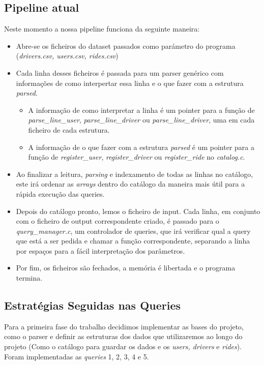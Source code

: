 \documentclass{article}
\begin{document}
        \subsection{Pipeline atual}
            Neste momento a nossa pipeline funciona da seguinte maneira: 
            \begin{itemize}
                \item Abre-se os ficheiros do dataset passados como parámetro do 
                programa (\emph{drivers.csv, users.csv, rides.csv})
                \item Cada linha desses ficheiros é passada para um parser genérico
                com informações de como interpertar essa linha e o que fazer com
                a estrutura \emph{parsed}.
                \begin{itemize}
                    \item A informação de como interpretar a linha é um pointer para
                    a função de \emph{parse\_line\_user}, \emph{parse\_line\_driver} ou \emph{parse\_line\_driver},
                    uma em cada ficheiro de cada estrutura.
                    \item A informação de o que fazer com a estrutura \emph{parsed} é um pointer para
                    a função de \emph{register\_user}, \emph{register\_driver} ou \emph{register\_ride}
                    no \emph{catalog.c}.
                \end{itemize}
                \item Ao finalizar a leitura, \emph{parsing} e indexamento de
                todas as linhas no catálogo, este irá ordenar as \emph{arrays} 
                dentro do catálogo da maneira mais útil para a rápida execução das 
                queries.
                \item Depois do catálogo pronto, lemos o ficheiro de input.
                Cada linha, em conjunto com o ficheiro de output correspondente criado,
                é passado para o \emph{query\_manager.c}, um controlador
                de queries, que irá verificar qual a query que está a ser pedida
                e chamar a função correspondente, separando a linha por espaços
                para a fácil interpretação dos parâmetros.
                \item Por fim, os ficheiros são fechados, a memória é libertada 
                e o programa termina.
            \end{itemize}
        \subsection{Estratégias Seguidas nas Queries}
            Para a primeira fase do trabalho decidimos implementar as bases do 
            projeto, como o parser e definir as estruturas dos dados que 
            utilizaremos ao longo do projeto (Como o catálogo para guardar os 
            dados e os \emph{users, drivers} e \emph{rides}). Foram 
            implementadas as \emph{queries} 1, 2, 3, 4 e 5. 
            
\end{document}
